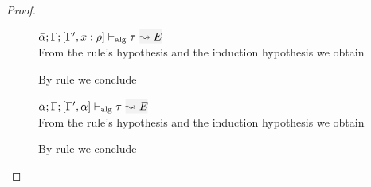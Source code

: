 \begin{proof}
\begin{description}
\item[]\quad
$\adlres{\bar\alpha}{\tenv}{\tenv',\relation{x}{\rulet}}{\type}{E}$\ \\

From the rule's hypothesis and the induction hypothesis we obtain
\begin{myequation*}
\end{myequation*}
By rule  we conclude
\begin{myequation*}
\end{myequation*}

\item[]\quad
$\adlres{\bar{\alpha}}{\tenv}{\tenv',\alpha}{\type}{E}$ \ \\

From the rule's hypothesis and the induction hypothesis we obtain
\begin{myequation*}
\end{myequation*}
By rule  we conclude
\begin{myequation*}
\end{myequation*}
\end{description}
\end{proof}


